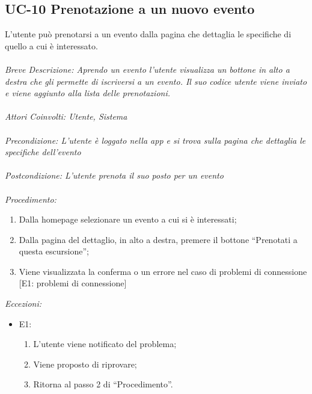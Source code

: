 \subsection{UC-10 Prenotazione a un nuovo evento}
L'utente può prenotarsi a un evento dalla pagina che dettaglia le specifiche di quello a cui è interessato.
\\
\\
\textit{Breve Descrizione: Aprendo un evento l'utente visualizza un bottone in alto a destra che gli permette di iscriversi a un evento. Il suo codice utente viene inviato e viene aggiunto alla lista delle prenotazioni.} 
\\
\\
\textit{Attori Coinvolti: Utente, Sistema}
\\
\\
\textit{Precondizione: L'utente è loggato nella app e si trova sulla pagina che dettaglia le specifiche dell'evento}
\\
\\
\textit{Postcondizione: L'utente prenota il suo posto per un evento}
\\
\\
\textit{Procedimento:}
\begin{enumerate}
	\item Dalla homepage selezionare un evento a cui si è interessati;
	\item Dalla pagina del dettaglio, in alto a destra, premere il bottone ``Prenotati a questa escursione'';
	\item Viene visualizzata la conferma o un errore nel caso di problemi di connessione [E1: problemi di connessione] 
\end{enumerate}


\textit{Eccezioni:}
\begin{itemize}
	\item E1:
	\begin{enumerate}
		\item L'utente viene notificato del problema;
		\item Viene proposto di riprovare;
		\item Ritorna al passo 2 di ``Procedimento''.
	\end{enumerate}
\end{itemize}